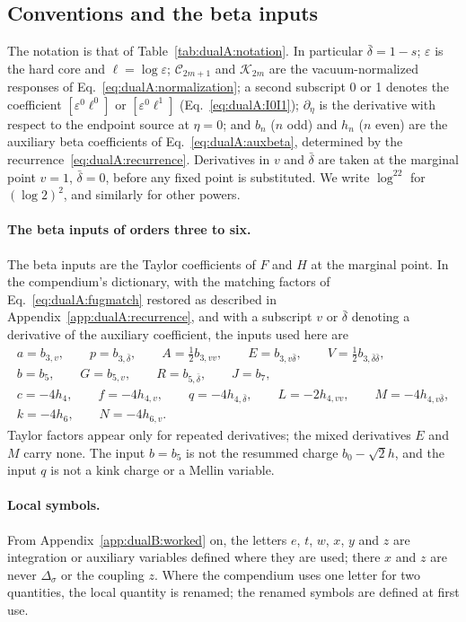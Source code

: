 \documentclass[11pt,a4paper]{article}
\numberwithin{equation}{section}
\newcommand{\Ds}{\Delta_\sigma}
\newcommand{\db}{\bar\delta}
\begin{document}
\subsection{Conventions and the beta inputs}\label{app:dualB:conv}
The notation is that of Table~\ref{tab:dualA:notation}. In particular $\db=1-s$; $\varepsilon$ is the hard core and
$\ell=\log\varepsilon$; $\mathcal C_{2m+1}$ and $\mathcal K_{2m}$ are the vacuum-normalized responses of
Eq.~\eqref{eq:dualA:normalization}; a second subscript 0 or 1 denotes the coefficient $[\varepsilon^0\ell^0]$ or
$[\varepsilon^0\ell^1]$ (Eq.~\eqref{eq:dualA:I0I1}); $\partial_\eta$ is the derivative with respect to the endpoint
source at $\eta=0$; and $b_n$ ($n$ odd) and $h_n$ ($n$ even) are the auxiliary beta coefficients of
Eq.~\eqref{eq:dualA:auxbeta}, determined by the recurrence~\eqref{eq:dualA:recurrence}. Derivatives in $v$ and $\db$
are taken at the marginal point $v=1$, $\db=0$, before any fixed point is substituted. We write $\log^22$ for
$(\log2)^2$, and similarly for other powers.

\paragraph{The beta inputs of orders three to six.} The beta inputs are the Taylor coefficients of $F$ and $H$ at the
marginal point. In the compendium's dictionary, with the matching factors of Eq.~\eqref{eq:dualA:fugmatch} restored as
described in Appendix~\ref{app:dualA:recurrence}, and with a subscript $v$ or $\db$ denoting a derivative of the
auxiliary coefficient, the inputs used here are
\begin{equation}
\begin{gathered}
 a=b_{3,v},\qquad p=b_{3,\db},\qquad A=\tfrac12b_{3,vv},\qquad E=b_{3,v\db},\qquad V=\tfrac12b_{3,\db\db},\\
 b=b_5,\qquad G=b_{5,v},\qquad R=b_{5,\db},\qquad J=b_7,\\
 c=-4h_4,\qquad f=-4h_{4,v},\qquad q=-4h_{4,\db},\qquad L=-2h_{4,vv},\qquad M=-4h_{4,v\db},\\
 k=-4h_6,\qquad N=-4h_{6,v}.
\end{gathered}
\label{eq:dualB:dictionary}
\end{equation}
Taylor factors appear only for repeated derivatives; the mixed derivatives $E$ and $M$ carry none. The input $b=b_5$
is not the resummed charge $b_0-\sqrt2h$, and the input $q$ is not a kink charge or a Mellin variable.

\paragraph{Local symbols.} From Appendix~\ref{app:dualB:worked} on, the letters $e$, $t$, $w$, $x$, $y$ and $z$ are
integration or auxiliary variables defined where they are used; there $x$ and $z$ are never $\Ds$ or the coupling $z$.
Where the compendium uses one letter for two quantities, the local quantity is renamed; the renamed symbols are
defined at first use.
\end{document}
